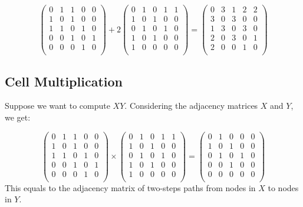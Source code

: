 \documentclass[
  notitlepage,
  onecolumn,
  openany]{book}
\begin{document}
\[
\left(  
\begin{array}{ccccc}
0 & 1 & 1 & 0 & 0\\
1 & 0 & 1 & 0 & 0 \\
1 & 1 & 0 & 1 & 0 \\
0 & 0 & 1 & 0 & 1 \\
0 & 0 & 0 & 1 & 0 \\
\end{array}
\right)+2
\left(  
\begin{array}{ccccc}
0 & 1 & 0 & 1 & 1\\
1 & 0 & 1 & 0 & 0 \\
0 & 1 & 0 & 1 & 0 \\
1 & 0 & 1 & 0 & 0 \\
1 & 0 & 0 & 0 & 0 \\
\end{array}
\right) = 
\left(  
\begin{array}{ccccc}
0 & 3 & 1 & 2 & 2\\
3 & 0 & 3 & 0 & 0 \\
1 & 3 & 0 & 3 & 0 \\
2 & 0 & 3 & 0 & 1 \\
2 & 0 & 0 & 1 & 0 \\
\end{array}
\right)
\]

\hypertarget{cell-multiplication}{%
\subsection{Cell Multiplication}\label{cell-multiplication}}

Suppose we want to compute \(XY\). Considering the adjacency matrices \(X\) and \(Y\), we get:

\[
\left(  
\begin{array}{ccccc}
0 & 1 & 1 & 0 & 0\\
1 & 0 & 1 & 0 & 0 \\
1 & 1 & 0 & 1 & 0 \\
0 & 0 & 1 & 0 & 1 \\
0 & 0 & 0 & 1 & 0 \\
\end{array}
\right)\times
\left(  
\begin{array}{ccccc}
0 & 1 & 0 & 1 & 1\\
1 & 0 & 1 & 0 & 0 \\
0 & 1 & 0 & 1 & 0 \\
1 & 0 & 1 & 0 & 0 \\
1 & 0 & 0 & 0 & 0 \\
\end{array}
\right) = 
\left(  
\begin{array}{ccccc}
0 & 1 & 0 & 0 & 0\\
1 & 0 & 1 & 0 & 0 \\
0 & 1 & 0 & 1 & 0 \\
0 & 0 & 1 & 0 & 0 \\
0 & 0 & 0 & 0 & 0 \\
\end{array}
\right)
\]
This equals to the adjacency matrix of two-steps paths from nodes in \(X\) to nodes in \(Y\).
\end{document}
